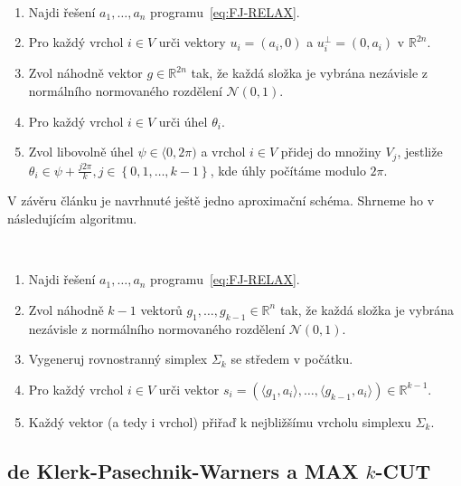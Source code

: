 \begin{alg}$ $
    \begin{enumerate}
        \item Najdi řešení $a_1, \dots, a_n$ programu~\ref{eq:FJ-RELAX}.
        \item Pro každý vrchol $i \in V$ urči vektory $u_i = (a_i, 0)$ a $u_i^\bot = (0, a_i)$ v $\mathbb{R}^{2n}$.
        \item Zvol náhodně vektor $g \in \mathbb{R}^{2n}$ tak, že každá složka je vybrána nezávisle z normálního normovaného rozdělení $\mathcal{N}(0, 1)$.
        \item Pro každý vrchol $i \in V$ urči úhel $\theta_i$.
        \item Zvol libovolně úhel $\psi \in \langle 0, 2 \pi )$ a vrchol $i \in V$ přidej do množiny $V_j$, jestliže $\theta_i \in \psi + \frac{j 2 \pi}{k}, j \in \left\{ 0, 1, \dots, k-1 \right\}$, kde úhly počítáme modulo $2\pi$.
    \end{enumerate}
    \label{alg:n-max-k-cut-1}
\end{alg}

V závěru článku je navrhnuté ještě jedno aproximační schéma. Shrneme ho v následujícím algoritmu.

\begin{alg}$ $
    \begin{enumerate}
        \item Najdi řešení $a_1, \dots, a_n$ programu~\ref{eq:FJ-RELAX}.
        \item Zvol náhodně $k-1$ vektorů $g_1, \dots, g_{k-1} \in \mathbb{R}^n$ tak, že každá složka je vybrána nezávisle z normálního normovaného rozdělení $\mathcal{N}(0, 1)$.
        \item Vygeneruj rovnostranný simplex $\Sigma_k$ se středem v počátku.
        \item Pro každý vrchol $i \in V$ urči vektor $s_i = \left( \langle g_1, a_i \rangle, \dots, \langle g_{k-1}, a_i \rangle \right) \in \mathbb{R}^{k-1}$.
        \item Každý vektor (a tedy i vrchol) přiřaď k nejbližšímu vrcholu simplexu $\Sigma_k$.
    \end{enumerate}
    \label{alg:n-max-k-cut-2}
\end{alg}


\subsection{de Klerk-Pasechnik-Warners a MAX $k$-CUT}

